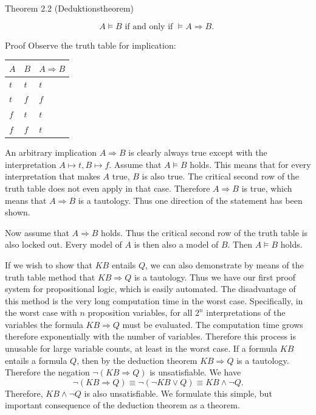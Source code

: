 \documentclass[10pt]{book}
\begin{document}
Theorem 2.2 (Deduktionstheorem)

$$
A \models B \text { if and only if } \models A \Rightarrow B \text {. }
$$

Proof Observe the truth table for implication:

\begin{center}
\begin{tabular}{lll}
\hline
$A$ & $B$ & $A \Rightarrow B$ \\
\hline
$t$ & $t$ & $t$ \\
\hline
$t$ & $f$ & $f$ \\
\hline
$f$ & $t$ & $t$ \\
\hline
$f$ & $f$ & $t$ \\
\hline
\end{tabular}
\end{center}

An arbitrary implication $A \Rightarrow B$ is clearly always true except with the interpretation $A \longmapsto t, B \longmapsto f$. Assume that $A \models B$ holds. This means that for every interpretation that makes $A$ true, $B$ is also true. The critical second row of the truth table does not even apply in that case. Therefore $A \Rightarrow B$ is true, which means that $A \Rightarrow B$ is a tautology. Thus one direction of the statement has been shown.

Now assume that $A \Rightarrow B$ holds. Thus the critical second row of the truth table is also locked out. Every model of $A$ is then also a model of $B$. Then $A \models B$ holds.

If we wish to show that $K B$ entails $Q$, we can also demonstrate by means of the truth table method that $K B \Rightarrow Q$ is a tautology. Thus we have our first proof system for propositional logic, which is easily automated. The disadvantage of this method is the very long computation time in the worst case. Specifically, in the worst case with $n$ proposition variables, for all $2^{n}$ interpretations of the variables the formula $K B \Rightarrow Q$ must be evaluated. The computation time grows therefore exponentially with the number of variables. Therefore this process is unusable for large variable counts, at least in the worst case.
If a formula $KB$ entails a formula $Q$, then by the deduction theorem $KB \Rightarrow Q$ is a tautology. Therefore the negation $\neg(KB \Rightarrow Q)$ is unsatisfiable. We have
$$
\neg(KB \Rightarrow Q) \equiv \neg(\neg KB \vee Q) \equiv KB \wedge \neg Q.
$$
Therefore, $KB \wedge \neg Q$ is also unsatisfiable. We formulate this simple, but important consequence of the deduction theorem as a theorem.
\end{document}
